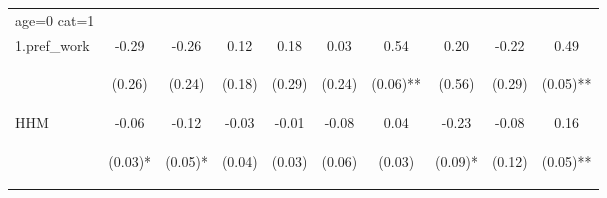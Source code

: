 \begin{center}
\begin{tabular}{lccccccccc}
\hline \noalign{\smallskip}age=0 cat=1 &  &  &  &  &  &  &  &  & \\
\noalign{\smallskip}\hline \noalign{\smallskip}1.pref_work & -0.29 & -0.26 & 0.12 & 0.18 & 0.03 & 0.54 & 0.20 & -0.22 & 0.49\\
 & \begin{footnotesize}(0.26)\end{footnotesize} & \begin{footnotesize}(0.24)\end{footnotesize} & \begin{footnotesize}(0.18)\end{footnotesize} & \begin{footnotesize}(0.29)\end{footnotesize} & \begin{footnotesize}(0.24)\end{footnotesize} & \begin{footnotesize}(0.06)**\end{footnotesize} & \begin{footnotesize}(0.56)\end{footnotesize} & \begin{footnotesize}(0.29)\end{footnotesize} & \begin{footnotesize}(0.05)**\end{footnotesize}\\
\noalign{\smallskip}HHM & -0.06 & -0.12 & -0.03 & -0.01 & -0.08 & 0.04 & -0.23 & -0.08 & 0.16\\
 & \begin{footnotesize}(0.03)*\end{footnotesize} & \begin{footnotesize}(0.05)*\end{footnotesize} & \begin{footnotesize}(0.04)\end{footnotesize} & \begin{footnotesize}(0.03)\end{footnotesize} & \begin{footnotesize}(0.06)\end{footnotesize} & \begin{footnotesize}(0.03)\end{footnotesize} & \begin{footnotesize}(0.09)*\end{footnotesize} & \begin{footnotesize}(0.12)\end{footnotesize} & \begin{footnotesize}(0.05)**\end{footnotesize}\\

\end{tabular}
\end{center}
